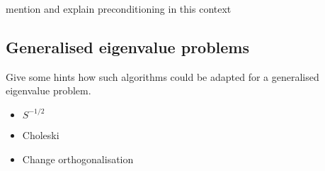 mention and explain preconditioning in this context

\subsection{Generalised eigenvalue problems}
\label{sec:GeneralisedEigenvalueProblem}
Give some hints how such algorithms
could be adapted for a generalised eigenvalue problem.


\begin{itemize}
	\item $S^{-1/2}$
	\item Choleski
	\item Change orthogonalisation
\end{itemize}


